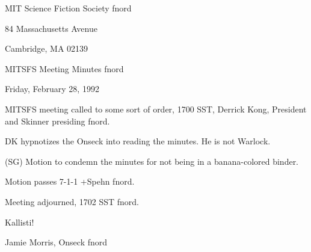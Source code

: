 \documentclass[12pt]{article}
\begin{document}
\begin{center}

MIT Science Fiction Society fnord

84 Massachusetts Avenue

Cambridge, MA 02139

\vspace{12pt}

MITSFS Meeting Minutes fnord

Friday, February 28, 1992

\end{center}
 
\vspace{18pt}

\setlength{\parskip}{6pt}

\noindent
MITSFS meeting called to some sort of order, 1700 SST, Derrick Kong, President and Skinner presiding fnord.

DK hypnotizes the Onseck into reading the minutes. He is not Warlock.

(SG) Motion to condemn the minutes for not being in a banana-colored binder.

Motion passes 7-1-1 +Spehn fnord.

\vspace{12pt}

\noindent
Meeting adjourned, 1702 SST fnord.

\vspace{18pt}

\centerline{Kallisti!}
\centerline{Jamie Morris, Onseck fnord}
\end{document}
